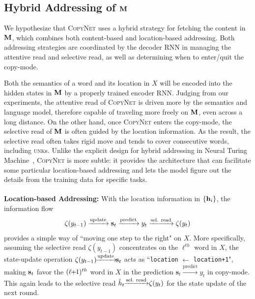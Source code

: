 \subsection{Hybrid Addressing of $\mathbf{M}$} 
\label{sec:reading}
We hypothesize that \textsc{CopyNet} uses a hybrid strategy for fetching the content in $\mathbf{M}$, which combines both content-based and location-based addressing. Both addressing strategies are coordinated by the decoder RNN in managing the attentive read and selective read, as well as determining when to enter/quit the copy-mode. 

Both the semantics of a word and its location in $X$ will be encoded into the hidden states in $\mathbf{M}$ by a properly trained encoder RNN. Judging from our experiments, the attentive read of \textsc{CopyNet} is driven more by the semantics and language model, therefore capable of traveling more freely on $\mathbf{M}$, even across a long distance. On the other hand, once \textsc{CopyNet} enters the copy-mode, the selective read of $\mathbf{M}$ is often guided by the location information. As the result, the selective read often takes rigid move and tends to cover consecutive words, including \textsc{unk}s.  Unlike the explicit design for hybrid addressing in Neural Turing Machine~\cite{graves2014neural,kurach2015neural}, \textsc{CopyNet} is more subtle: it provides the architecture that can facilitate some particular location-based addressing and lets the model figure out the details from the training data for specific tasks. \\\vspace{-7pt} \\
\textbf{Location-based Addressing:} 
With the location information in $\{\mathbf{h}_i\}$, the information flow  \vspace{-5pt} %
\[
\zeta(y_{t-1}) \xrightarrow{\text{update}}  \mathbf{s}_{t} \xrightarrow{\text{predict}} y_{t} \xrightarrow{\text{sel. read}}  \zeta(y_{t}) \vspace{-5pt} 
\]
provides a simple way of ``moving one step to the right" on $X$. More specifically, assuming the selective read $\zeta(y_{t-1})$ concentrates on the $\ell^{th}$ word in $X$, the state-update operation $\zeta(y_{t-1})\hspace{-4pt} \xrightarrow{\text{update}} \hspace{-4pt} \mathbf{s}_t $ acts as ``\texttt{\small location} $\leftarrow$ \texttt{\small location+1}", making $\mathbf{s}_t$ favor the $(\ell \hspace{-3pt}+\hspace{-3pt}1)^{th}$ word in $X$ in the prediction $\mathbf{s}_t \xrightarrow{\text{predict}} y_{t}$ in copy-mode. This again leads to the selective read  $\hat{h}_{t} \hspace{-3pt}\xrightarrow{\text{sel. read}} \hspace{-3pt} \zeta(y_{t})$ for the state update of the next round.
